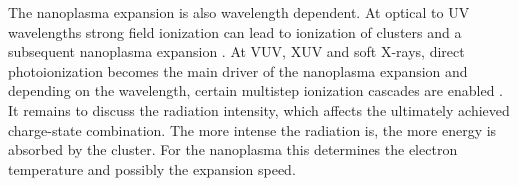 %
The nanoplasma expansion is also wavelength dependent. At optical to UV wavelengths strong field ionization can lead to ionization of clusters and a subsequent nanoplasma expansion \citep{Springate-2000-PRA}. At VUV, XUV and soft X-rays, direct photoionization becomes the main driver of the nanoplasma expansion and depending on the wavelength, certain multistep ionization cascades are enabled \citep{Arbeiter-2011-NJP}. It remains to discuss the radiation intensity, which affects the ultimately achieved charge-state combination. The more intense the radiation is, the more energy is absorbed by the cluster. For the nanoplasma this determines the electron temperature and possibly the expansion speed.
%
%
%
